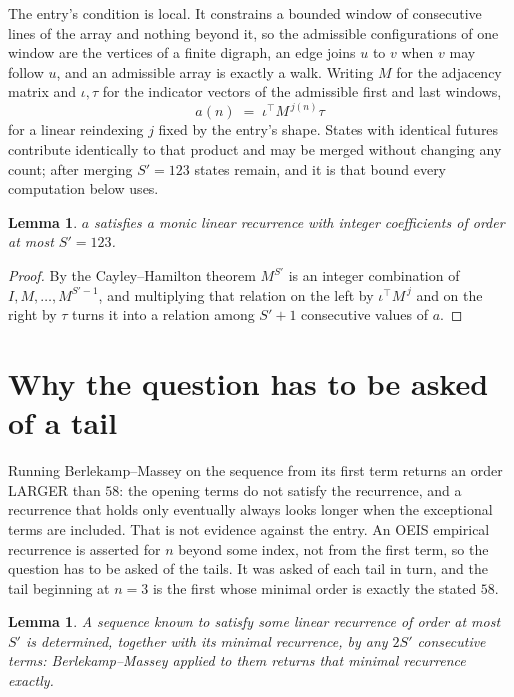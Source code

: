 \documentclass[11pt,a4paper]{article}
\theoremstyle{plain}
\newtheorem{lemma}[theorem]{Lemma}
\theoremstyle{definition}
\begin{document}
The entry's condition is local. It constrains a bounded window of consecutive lines of the
array and nothing beyond it, so the admissible configurations of one window are the vertices of
a finite digraph, an edge joins $u$ to $v$ when $v$ may follow $u$, and an admissible array is
exactly a walk. Writing $M$ for the adjacency matrix and $\iota,\tau$ for the indicator vectors
of the admissible first and last windows,
\[
a(n)\;=\;\iota^{\!\top}M^{\,j(n)}\tau
\]
for a linear reindexing $j$ fixed by the entry's shape. States with identical futures
contribute identically to that product and may be merged without changing any count; after
merging $S'=123$ states remain, and it is that bound every computation below uses.

\begin{lemma}\label{lem:cf}
$a$ satisfies a monic linear recurrence with integer coefficients of order at most $S'=123$.
\end{lemma}

\begin{proof}
By the Cayley--Hamilton theorem $M^{S'}$ is an integer combination of $I,M,\dots,M^{S'-1}$,
and multiplying that relation on the left by $\iota^{\!\top}M^{\,j}$ and on the right by
$\tau$ turns it into a relation among $S'+1$ consecutive values of $a$.
\end{proof}

\section{Why the question has to be asked of a tail}

Running Berlekamp--Massey on the sequence from its first term returns an order LARGER than $58$: the opening terms do not satisfy the recurrence, and a recurrence that holds only eventually always looks longer when the exceptional terms are included. That is not evidence against the entry. An OEIS empirical recurrence is asserted for $n$ beyond some index, not from the first term, so the question has to be asked of the tails. It was asked of each tail in turn, and the tail beginning at $n=3$ is the first whose minimal order is exactly the stated $58$.

\begin{lemma}\label{lem:bm}
A sequence known to satisfy some linear recurrence of order at most $S'$ is determined,
together with its minimal recurrence, by any $2S'$ consecutive terms: Berlekamp--Massey applied
to them returns that minimal recurrence exactly.
\end{lemma}
\end{document}
